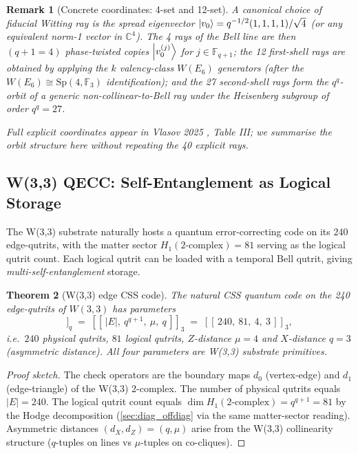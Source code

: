 ﻿\documentclass[12pt]{article}
\newtheorem{theorem}{Theorem}[section]
\newtheorem{remark}[theorem]{Remark}
\newcommand{\CC}{\mathbb{C}}
\newcommand{\GF}[1]{\mathbb{F}_{#1}}
\begin{document}
\begin{remark}[Concrete coordinates: 4-set and 12-set]
A canonical choice of fiducial Witting ray is the spread eigenvector
$\ket{v_0} = q^{-1/2}(1, 1, 1, 1)/\sqrt 4$ (or any equivalent
norm-1 vector in $\CC^4$).  The 4 rays of the Bell line are then
$(q+1=4)$ phase-twisted copies $\ket{v_0^{(j)}}$ for $j \in \GF{q+1}$;
the 12 first-shell rays are obtained by applying the $k$ valency-class
$W(E_6)$ generators (after the $W(E_6) \cong \mathrm{Sp}(4,\GF{3})$
identification); and the 27 second-shell rays form the $q^q$-orbit of a
generic non-collinear-to-Bell ray under the Heisenberg subgroup of order
$q^q = 27$.

Full explicit coordinates appear in Vlasov 2025
\cite{Vlasov2025}, Table III; we summarise the orbit structure here
without repeating the 40 explicit rays.
\end{remark}

\subsection{W(3,3) QECC: Self-Entanglement as Logical Storage}
\label{sec:qecc}

The W(3,3) substrate naturally hosts a quantum error-correcting code on
its 240 edge-qutrits, with the matter sector $H_1(2\text{-complex}) = 81$
serving as the logical qutrit count.  Each logical qutrit can be loaded
with a temporal Bell qutrit, giving \emph{multi-self-entanglement} storage.

\begin{theorem}[W(3,3) edge CSS code]\label{thm:edge_css}
The natural CSS quantum code on the 240 edge-qutrits of $W(3,3)$ has
parameters
\begin{equation}
  [[n, k, d_Z, d_X]]_q  \;=\;  [[\,|E|,\ q^{q+1},\ \mu,\ q\,]]_3
  \;=\;  [[\,240,\ 81,\ 4,\ 3\,]]_3,
\end{equation}
i.e.\ $240$ physical qutrits, $81$ logical qutrits, $Z$-distance $\mu = 4$
and $X$-distance $q = 3$ (asymmetric distance).  All four parameters are
W(3,3) substrate primitives.
\end{theorem}

\begin{proof}[Proof sketch]
The check operators are the boundary maps $d_0$ (vertex-edge) and $d_1$
(edge-triangle) of the W(3,3) 2-complex.  The number of physical qutrits
equals $|E| = 240$.  The logical qutrit count equals $\dim H_1(2\text{-complex})
= q^{q+1} = 81$ by the Hodge decomposition (\cref{sec:diag_offdiag} via
the same matter-sector reading).  Asymmetric distances $(d_X, d_Z) = (q, \mu)$
arise from the W(3,3) collinearity structure ($q$-tuples on lines vs
$\mu$-tuples on co-cliques).
\end{proof}
\end{document}
